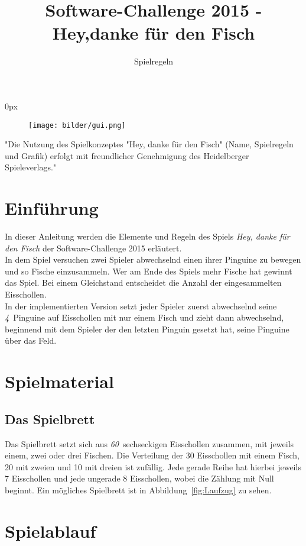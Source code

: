 \documentclass[a4paper, ngerman]{scrartcl}
\title{Software-Challenge 2015 - Hey,danke für den Fisch}
\subtitle{Spielregeln}
\newcommand{\FelderAnzahl}{\emph{60}}
\newcommand{\PinguinAnzahl}{\emph{4}}
\begin{document}
\parindent0px
\maketitle

\begin{figure}[h!]
	\centering
	\texttt{[image: bilder/gui.png]} 
\end{figure}
\vspace*{\fill}
"Die Nutzung des Spielkonzeptes "Hey, danke für den Fisch" (Name, Spielregeln
und Grafik) erfolgt mit freundlicher Genehmigung des Heidelberger
Spieleverlags."
\newpage
\tableofcontents
\newpage

\section{Einführung}
In dieser Anleitung werden die Elemente und Regeln des Spiels \emph{Hey, danke
für den Fisch} der Software-Challenge 2015 erläutert.\\
In dem Spiel versuchen zwei Spieler
abwechselnd einen ihrer Pinguine zu bewegen und so Fische einzusammeln. Wer
am Ende des Spiels mehr Fische hat gewinnt das Spiel. Bei einem Gleichstand 
entscheidet die Anzahl der eingesammelten Eisschollen.\\
In der implementierten Version setzt jeder Spieler zuerst abwechselnd seine 
\PinguinAnzahl\ Pinguine auf Eisschollen mit nur einem Fisch und zieht dann
abwechselnd, beginnend mit dem Spieler der den letzten Pinguin gesetzt hat, seine Pinguine
über das Feld.

\section{Spielmaterial}
	\subsection{Das Spielbrett}
Das Spielbrett setzt sich aus \FelderAnzahl\ sechseckigen Eisschollen zusammen,
mit jeweils einem, zwei oder drei Fischen.
Die Verteilung der 30 Eisschollen mit einem Fisch, 20 mit zweien und 10 mit
dreien ist zufällig.
Jede gerade Reihe hat hierbei jeweils 7 Eisschollen und jede ungerade 8
Eisschollen, wobei die Zählung mit Null beginnt. Ein mögliches Spielbrett ist
in Abbildung~\ref{fig:Laufzug} zu sehen.
\section{Spielablauf}	 
\end{document}
